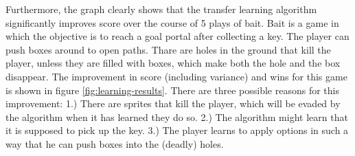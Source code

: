 Furthermore, the graph clearly shows that the transfer learning algorithm
significantly improves score over the course of 5 plays of bait.  Bait is a game
in which the objective is to reach a goal portal after collecting a key. The
player can push boxes around to open paths.  Thare are holes in the ground that
kill the player, unless they are filled with boxes, which make both the hole and
the box disappear.  The improvement in score (including variance) and wins for
this game is shown in figure \ref{fig:learning-results}. There are three
possible reasons for this improvement: 1.) There are sprites that kill the
player, which will be evaded by the algorithm when it has learned they do so.
2.) The algorithm might learn that it is supposed to pick up the key. 3.) The
player learns to apply options in such a way that he can push boxes into the
(deadly) holes.

